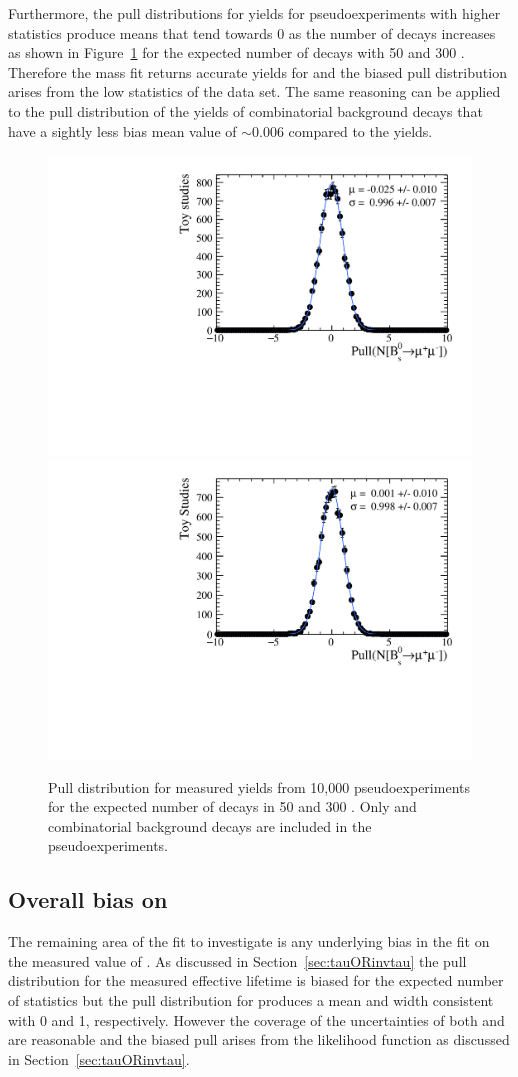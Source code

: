 Furthermore, the pull distributions for \bsmumu yields for pseudoexperiments with higher statistics produce means that tend towards 0 as the number of decays increases as shown in Figure~\ref{fig:BsmumuYieldPulls} for the expected number of decays with 50 and 300 \fb. Therefore the mass fit returns accurate yields for \bsmumu and the biased pull distribution arises from the low statistics of the data set. The same reasoning can be applied to the pull distribution of the yields of combinatorial background decays that have a sightly less bias mean value of $\sim0.006$ compared to the \bsmumu yields.

\begin{figure}[htbp]
    \centering
        \includegraphics[width=0.49 \textwidth]{./Figs/LifetimeSystematics/Bs2MuMu_yield_pull_50fb.pdf}
        \includegraphics[width=0.49 \textwidth]{./Figs/LifetimeSystematics/Bs2MuMu_yield_pull_300fb.pdf}
    \caption{Pull distribution for \bsmumu measured yields from 10,000 pseudoexperiments for the expected number of decays in 50 and 300 \fb. Only \bsmumu and combinatorial background decays are included in the pseudoexperiments.}
    \label{fig:BsmumuYieldPulls}
\end{figure}


\subsection{Overall bias on \tmumu}
The remaining area of the fit to investigate is any underlying bias in the fit on the measured value of \tmumu. As discussed in Section~\ref{sec:tauORinvtau} the pull distribution for the measured effective lifetime is biased for the expected number of statistics but the pull distribution for \Gmumu produces a mean and width consistent with 0 and 1, respectively. However the coverage of the uncertainties of both \tmumu and \Gmumu are reasonable and the biased \tmumu pull arises from the likelihood function as discussed in Section~\ref{sec:tauORinvtau}. 

